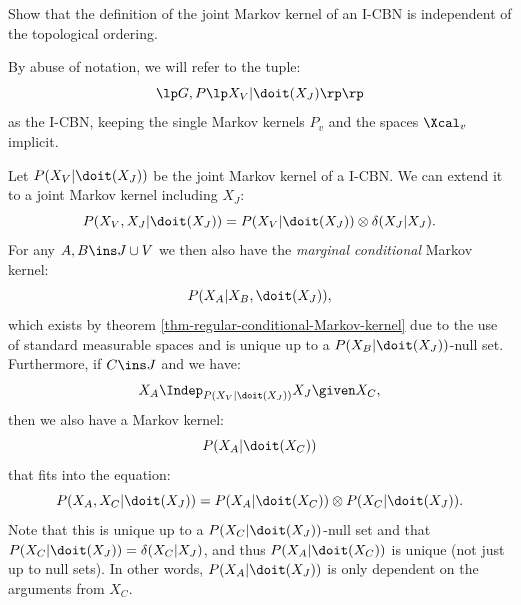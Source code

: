 \begin{Exc}
    Show that the definition of the joint Markov kernel of an I-CBN is independent of the topological ordering.
\end{Exc}

\begin{Not}
    By abuse of notation, we will refer to the tuple: 
    \[\lp G, P\lp X_V|\doit(X_J)\rp\rp\] 
    as the I-CBN, keeping the single Markov kernels $P_v$ and the spaces $\Xcal_v$ implicit.
\end{Not}

\begin{Rem}
    Let $P(X_V|\doit(X_J))$ be the joint Markov kernel of a I-CBN.
    We can extend it to a joint Markov kernel including $X_J$:
    \[P(X_V,X_J|\doit(X_J)) = P(X_V|\doit(X_J)) \otimes \delta(X_J|X_J).  \]
    For any $A, B \ins J \cup V$ we then also have the \emph{marginal conditional} Markov kernel:
    \[P(X_A|X_B,\doit(X_J)),\]
    which exists by theorem \ref{thm-regular-conditional-Markov-kernel} due to the use of standard measurable spaces
    and is unique up to a $P(X_B|\doit(X_J))$-null set.\\
    Furthermore, if $C \ins J$ and we have: 
    \[X_A \Indep_{P(X_V|\doit(X_J))} X_J \given X_C,\]
    then we also have a Markov kernel:
    \[ P(X_A|\doit(X_C)) \]
    that fits into the equation:
    \[ P(X_A,X_C|\doit(X_J)) = P(X_A|\doit(X_C)) \otimes P(X_C|\doit(X_J)). \]
    Note that this is unique up to a $P(X_C|\doit(X_J))$-null set and that $P(X_C|\doit(X_J)) = \delta(X_C|X_J)$, 
    and thus $P(X_A|\doit(X_C))$ is unique (not just up to null sets).
    In other words, $P(X_A|\doit(X_J))$ is only dependent on the arguments from $X_C$. 
\end{Rem}

